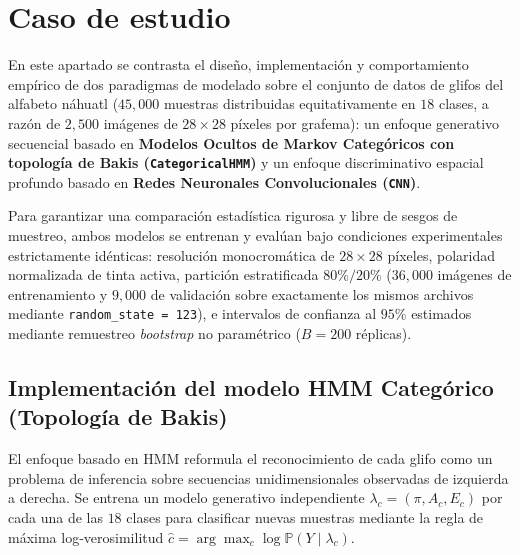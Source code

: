 \documentclass[
  spanish,
  us-letterpaper,
]{scrreprt}
\theoremstyle{definition}
\theoremstyle{remark}
\begin{document}
\chapter{Caso de estudio}\label{caso-de-estudio}

En este apartado se contrasta el diseño, implementación y comportamiento
empírico de dos paradigmas de modelado sobre el conjunto de datos de
glifos del alfabeto náhuatl (\(45{,}000\) muestras distribuidas
equitativamente en \(18\) clases, a razón de \(2{,}500\) imágenes de
\(28 \times 28\) píxeles por grafema): un enfoque generativo secuencial
basado en \textbf{Modelos Ocultos de Markov Categóricos con topología de
Bakis (\texttt{CategoricalHMM})} y un enfoque discriminativo espacial
profundo basado en \textbf{Redes Neuronales Convolucionales
(\texttt{CNN})}.

Para garantizar una comparación estadística rigurosa y libre de sesgos
de muestreo, ambos modelos se entrenan y evalúan bajo condiciones
experimentales estrictamente idénticas: resolución monocromática de
\(28 \times 28\) píxeles, polaridad normalizada de tinta activa,
partición estratificada \(80\% / 20\%\) (\(36{,}000\) imágenes de
entrenamiento y \(9{,}000\) de validación sobre exactamente los mismos
archivos mediante \texttt{random\_state\ =\ 123}), e intervalos de
confianza al \(95\%\) estimados mediante remuestreo \emph{bootstrap} no
paramétrico (\(B = 200\) réplicas).

\section{Implementación del modelo HMM Categórico (Topología de
Bakis)}\label{implementaciuxf3n-del-modelo-hmm-categuxf3rico-topologuxeda-de-bakis}

El enfoque basado en HMM reformula el reconocimiento de cada glifo como
un problema de inferencia sobre secuencias unidimensionales observadas
de izquierda a derecha. Se entrena un modelo generativo independiente
\(\lambda_c = (\pi, A_c, E_c)\) por cada una de las \(18\) clases para
clasificar nuevas muestras mediante la regla de máxima log-verosimilitud
\(\hat{c} = \arg\max_{c} \log \mathbb{P}(Y \mid \lambda_c)\).
\end{document}
